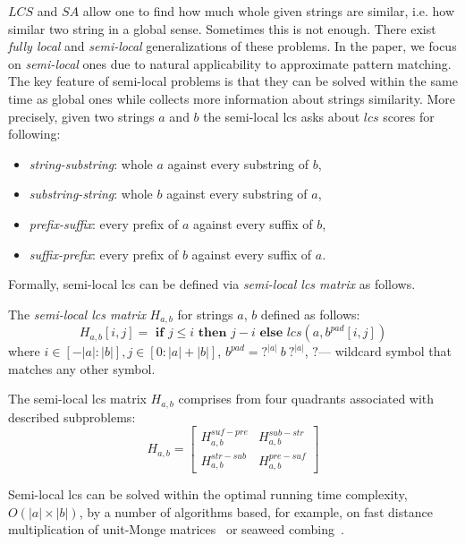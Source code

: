 $LCS$ and $SA$ allow one to find how much whole given strings are similar, i.e. how similar two string in a global sense.
Sometimes this is not enough.
There exist \emph{fully local} and \emph{semi-local} generalizations of these problems.
In the paper, we focus on \emph{semi-local} ones due to natural applicability to approximate pattern matching.
The key feature of semi-local problems is that they can be solved within the same time as global ones while collects more information about strings similarity.
More precisely, given two strings $a$ and $b$ the semi-local lcs asks about $lcs$ scores for following:
\begin{itemize}
\item \emph{string-substring}: whole $a$ against every substring of $b$,
\item \emph{substring-string}: whole $b$ against every substring of $a$,
\item \emph{prefix-suffix}: every prefix of $a$ against every suffix of $b$,
\item \emph{suffix-prefix}: every prefix of $b$ against every suffix of $a$.
\end{itemize} 
Formally, semi-local lcs can be defined via \emph{semi-local lcs matrix} as follows.
\begin{definition}
The \emph{semi-local lcs matrix}  $H_{a,b}$ for strings $a$, $b$ defined as follows:
\begin{equation}
  H_{a,b}[i,j] = \textbf{ if } j\leq i \textbf{ then } j-i \textbf{ else } lcs(a,b^{pad}[i,j]) 
\end{equation} 
where $i \in [-|a|:|b|], j \in [0:|a|+|b|] $, $b^{pad}= ?^{|a|}\ b\ ?^{|a|}$, $?$--- wildcard symbol that matches any other symbol.
\end{definition}
The semi-local lcs matrix $H_{a,b}$ comprises from four quadrants associated with described subproblems:
\begin{equation}
  H_{a,b} = \begin{bmatrix}
    H_{a,b}^{suf-pre} & H_{a,b}^{sub-str} \\
    H_{a,b}^{str-sub} & H_{a,b}^{pre-suf} 
  \end{bmatrix}    
\end{equation}

Semi-local lcs can be solved within the optimal running time complexity, $O(|a| \times |b|)$, by a number of algorithms based, for example, on fast distance multiplication of unit-Monge matrices~\cite{.} or seaweed combing~\cite{.}.


